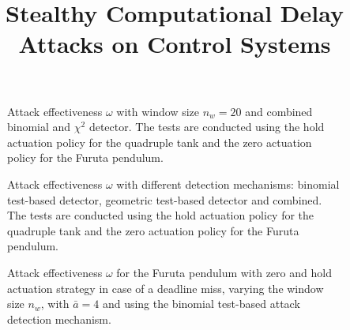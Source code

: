 \documentclass{article}
\title{Stealthy Computational Delay Attacks on Control Systems}
\renewcommand{\a}{a}
\newcommand{\maxa}{\bar{\a}}
\newcommand{\vecsize}[1]{n_{#1}}
\newcommand{\iteration}{w}
\newcommand{\aeffect}{\omega}
\begin{document}
\maketitle

\begin{figure*}
    \centering
    
    \vspace{-1cm}
    \caption{Attack effectiveness $\aeffect$ with window size $\vecsize{\iteration} = 20$ and combined binomial and $\chi^2$ detector. The tests are conducted using the hold actuation policy for the quadruple tank and the zero actuation policy for the Furuta pendulum.}
    \vspace{-.35cm}
    \label{fig:effect_maxa}
\end{figure*}

\begin{figure}
    \centering
    
    \vspace{-1cm}
    \caption{Attack effectiveness $\aeffect$ with different detection mechanisms: binomial test-based detector, geometric test-based detector and combined. The tests are conducted using the hold actuation policy for the quadruple tank and the zero actuation policy for the Furuta pendulum.}
    \vspace{-.35cm}
    \label{fig:effect_test}
\end{figure}

\begin{figure*}
    \centering
    
    \vspace{-1cm}
    \caption{Attack effectiveness $\aeffect$ for the Furuta pendulum with zero and hold actuation strategy in case of a deadline miss, varying the window size $\vecsize{\iteration}$, with $\maxa=4$ and using the binomial test-based attack detection mechanism.}
    \label{fig:effect_zerohold}
\end{figure*}
\end{document}
